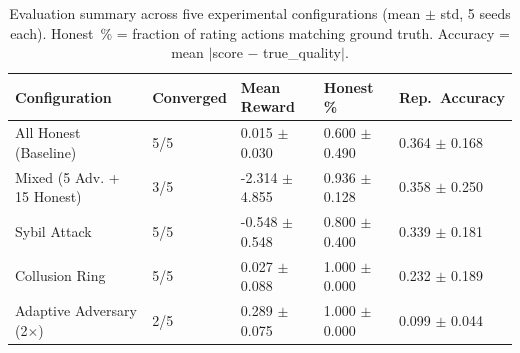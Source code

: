 \begin{table}[t!]
\centering
\caption{Evaluation summary across five experimental configurations (mean $\pm$ std, 5 seeds each).
Honest~\% = fraction of rating actions matching ground truth.
Accuracy = mean $|$score $-$ true\_quality$|$.}
\label{tab:summary}
\footnotesize
\renewcommand{\arraystretch}{1.2}
\begin{tabular}{@{}L{4.5cm}C{1.5cm}C{2.8cm}C{2.8cm}C{2.8cm}@{}}
\toprule
\textbf{Configuration} & \textbf{Converged} & \textbf{Mean Reward} & \textbf{Honest \%} & \textbf{Rep.\ Accuracy} \\
\midrule
All Honest (Baseline) & 5/5 & 0.015 $\pm$ 0.030 & 0.600 $\pm$ 0.490 & 0.364 $\pm$ 0.168 \\
Mixed (5 Adv. + 15 Honest) & 3/5 & -2.314 $\pm$ 4.855 & 0.936 $\pm$ 0.128 & 0.358 $\pm$ 0.250 \\
Sybil Attack & 5/5 & -0.548 $\pm$ 0.548 & 0.800 $\pm$ 0.400 & 0.339 $\pm$ 0.181 \\
Collusion Ring & 5/5 & 0.027 $\pm$ 0.088 & 1.000 $\pm$ 0.000 & 0.232 $\pm$ 0.189 \\
Adaptive Adversary (2$\times$) & 2/5 & 0.289 $\pm$ 0.075 & 1.000 $\pm$ 0.000 & 0.099 $\pm$ 0.044 \\
\bottomrule
\end{tabular}
\end{table}
